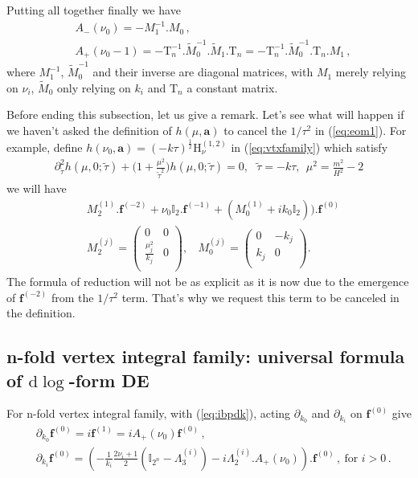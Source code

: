 \documentclass[a4paper,11pt]{article}
\newcommand{\nn}{\nonumber}
\newcommand{\nd}{\mathrm{d}}
\def\eqref#1{(\ref{#1})}
\begin{document}
Putting all together finally we have
\begin{align}
&A_-(\nu_0)=-M_1^{-1}.M_0\, , \nn\\
&A_+(\nu_0-1)=-\text{T}_n^{-1}.\tilde{M}_0^{-1}.\tilde{M}_1.\text{T}_n=-\text{T}_n^{-1}.\tilde{M}_0^{-1}.\text{T}_n. M_1\,, \label{eq:nibp}
\end{align}
where  $M_1^{-1}$, $\tilde{M}_0^{-1}$ and their inverse are diagonal matrices, with $M_1$ merely relying on $\nu_i$, $\tilde{M}_0$ only relying on $k_i$ and $\text{T}_n$  a constant matrix. 


Before ending this subsection, let us give a remark.
Let's see what will happen if we haven't asked the definition of $h(\mu,\bm{a})$ to cancel the $1/\tau^2$ in \eqref{eq:eom1}. For example, define $h(\nu_0,\bm{a})=(-k\tau)^{\frac{1}{2}}\text{H}_\nu^{(1,2)}$ in \eqref{eq:vtxfamily} which satisfy
\begin{align}
\partial_{\tilde{\tau}}^2 h(\mu,0;\tilde{\tau})+\Big(1+\frac{\mu^2}{\tilde{\tau}^2}\Big)h(\mu,0;\tilde{\tau})=0,~~~\tilde{\tau}=-k\tau,~~\mu^2=\frac{m^2}{H^2}-2
\end{align}
we will have 
\begin{align}
&M_{2}^{(1)}.\bm{f}^{(-2)}+\nu_0\mathbb{I}_{2}.\bm{f}^{(-1)}+\left(M_{0}^{(1)}+ik_0\mathbb{I}_{2}\right)).\bm{f}^{(0)}\nn\\
&M_{2}^{(j)}=\left(
\begin{array}{cc}
 0 & 0 \\
 \frac{\mu_j^2}{k_j} & 0 \\
\end{array}
\right) , ~~~~ M_{0}^{(j)}=\left(
\begin{array}{cc}
 0 & -k_j \\
 k_j & 0 \\
\end{array}
\right). 
\end{align} 
The formula of reduction will not be as explicit as it is now due to the emergence of $\bm{f}^{(-2)}$ from the $1/\tau^2$ term. That's why we request this term to be canceled in the definition.




\subsection{n-fold vertex integral family: universal formula of $\nd \log$-form DE}  \label{sec:3.5}
For n-fold vertex integral family, with \eqref{eq:ibpdk}, acting $\partial_{k_0}$ and $\partial_{k_i}$ on $\bm{f}^{(0)}$ give
\begin{align}
&\partial_{k_0}\bm{f}^{(0)}=i \bm{f}^{(1)} = i A_+(\nu_0)\bm{f}^{(0)} \,, \nn\\
&\partial_{k_i}\bm{f}^{(0)} = \left( - \frac{1}{ k_i}\frac{2\nu_i+1}{2}(\mathbb{I}_{2^n} - \Lambda_3^{(i)})-i  \Lambda_2^{(i)}.A_+(\nu_0) \right).\bm{f}^{(0)}\, , ~\text{for $i>0$}  \, .  \label{eq:nDE}
\end{align}
\end{document}
